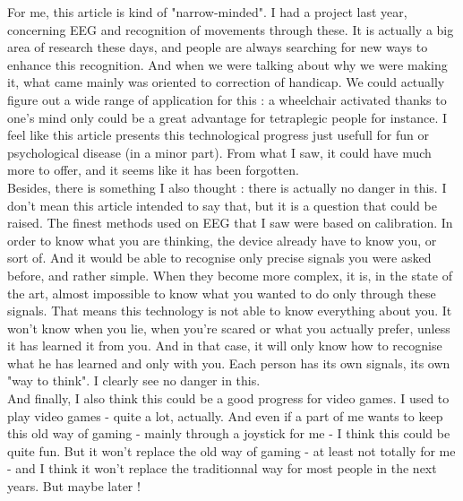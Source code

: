 \documentclass{article}
\begin{document}
\bigskip
For me, this article is kind of "narrow-minded". I had a project last year, concerning EEG and recognition of movements through these. It is actually a big area of research these days, and people are always searching for new ways to enhance this recognition. And when we were talking about why we were making it, what came mainly was oriented to correction of handicap. We could actually figure out a wide range of application for this : a wheelchair activated thanks to one's mind only could be a great advantage for tetraplegic people for instance. I feel like this article presents this technological progress just usefull for fun or psychological disease (in a minor part). From what I saw, it could have much more to offer, and it seems like it has been forgotten.\\
Besides, there is something I also thought : there is actually no danger in this. I don't mean this article intended to say that, but it is a question that could be raised. The finest methods used on EEG that I saw were based on calibration. In order to know what you are thinking, the device already have to know you, or sort of. And it would be able to recognise only precise signals you were asked before, and rather simple. When they become more complex, it is, in the state of the art, almost impossible to know what you wanted to do only through these signals. That means this technology is not able to know everything about you. It won't know when you lie, when you're scared or what you actually prefer, unless it has learned it from you. And in that case, it will only know how to recognise what he has learned and only with you. Each person has its own signals, its own "way to think". I clearly see no danger in this.\\
And finally, I also think this could be a good progress for video games. I used to play video games - quite a lot, actually. And even if a part of me wants to keep this old way of gaming - mainly through a joystick for me - I think this could be quite fun. But it won't replace the old way of gaming - at least not totally for me - and I think it won't replace the traditionnal way for most people in the next years. But maybe later !
\end{document}
